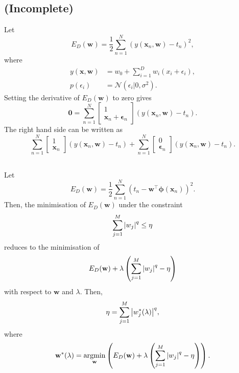 \subsection{(Incomplete)}
\label{3.4}
Let
%
\begin{equation}
E_D(\mathbf{w})
=
\frac{1}{2}
\sum_{n = 1}^{N}
\left(
	y(\mathbf{x}_n, \mathbf{w})
	-
	t_n
\right) ^ 2,
\end{equation}
%
where
%
\begin{equation}
\begin{aligned}
y(\mathbf{x}, \mathbf{w})
&=
w_0
+
\sum_{i = 1}^{D}
w_i
(x_i + \epsilon_i),
\\
p(\epsilon_i)
&=
\mathcal{N}
\left(
	\epsilon_i
	|
	0,
	\sigma ^ 2
\right).
\end{aligned}
\end{equation}
%
Setting the derivative of $E_D(\mathbf{w})$ to zero gives
%
\[
\mathbf{0}
=
\sum_{n = 1}^{N}
\begin{bmatrix}
1
\\
\mathbf{x}_n
+
\bm{\epsilon}_n
\end{bmatrix}
\left(
	y(\mathbf{x}_n, \mathbf{w})
	-
	t_n
\right).
\]
%
The right hand side can be written as
%
\[
\sum_{n = 1}^{N}
\begin{bmatrix}
1
\\
\mathbf{x}_n
\end{bmatrix}
\left(
	y(\mathbf{x}_n, \mathbf{w})
	-
	t_n
\right)
+
\sum_{n = 1}^{N}
\begin{bmatrix}
0
\\
\bm{\epsilon}_n
\end{bmatrix}
\left(
	y(\mathbf{x}_n, \mathbf{w})
	-
	t_n
\right).
\]
%


\subsection{}
\label{3.5}
Let
%
\begin{equation}
E_D (\mathbf{w})
=
\frac{1}{2}
\sum_{n = 1}^{N}
\left(
	t_n
	-
	\mathbf{w} ^ \intercal
	\bm{\phi} (\mathbf{x}_n)
\right) ^ 2.
\end{equation}
%
Then, the minimisation of $E_D (\mathbf{w})$ under the constraint 
%
\begin{equation}
\sum_{j = 1}^{M}
\abs{w_j} ^ q
\leq
\eta
\end{equation}
%
reduces to the minimisation of 
%
\begin{equation}
E_D (\mathbf{w})
+
\lambda
\left(
	\sum_{j = 1}^{M}
	\abs{w_j} ^ q
	-
	\eta
\right)
\end{equation}
%
with respect to $\mathbf{w}$ and $\lambda$.
Then,
%
\begin{equation}
\eta
=
\sum_{j = 1}^{M}
\abs{w^*_j(\lambda)} ^ q,
\end{equation}
%
where
%
\begin{equation}
\mathbf{w^*}(\lambda)
=
\operatorname*{arg min}_{\mathbf{w}}
\left(
	E_D (\mathbf{w})
	+
	\lambda
	\left(
		\sum_{j = 1}^{M}
		\abs{w_j} ^ q
		-
		\eta
	\right)
\right).
\end{equation}
%


